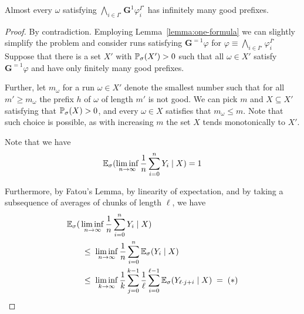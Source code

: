 \documentclass[a4paper,UKenglish]{lipics}
\newcommand{\Gf}[1]{\mathbf{G}^{#1}}
\newcommand{\Ex}[3][]{\ifblank{#1}{\mathbb{E}_{#2}}{\mathbb{E}^{#1}_{#2}}(#3)}
\renewcommand{\Pr}[3][]{\ifblank{#1}{\mathbb{P}_{#2}}{\mathbb{P}^{#1}_{#2}}(#3)}
\newcommand{\fix}[1]{{#1^\star}}
\newcommand{\fixI}{\fix{I}}
\begin{document}
\begin{lemma}\label{lemma:brew-often}
	Almost every $\omega$ satisfying $\bigwedge_{i\in \fixI} \Gf{1} \varphi^\fixI_i$
	has infinitely many good prefixes.
\end{lemma}
\begin{proof}
	By contradiction.
        Employing Lemma~\ref{lemma:one-formula} we can slightly simplify the problem and
        consider runs satisfying  $\Gf{=1}\varphi$ for $\varphi\equiv \bigwedge_{i\in \fixI} \varphi^\fixI_i$
        Suppose that there is a set $X'$ with $\Pr{\sigma}{X'} > 0$ such that
	all $\omega\in X'$ satisfy $\Gf{=1}\varphi$ and have only finitely
	many good prefixes.
	
	Further, let $m_\omega$ for a run $\omega\in X'$ denote the smallest number such that
	for all $m' \ge m_\omega$ the prefix $h$ of $\omega$ of length $m'$ is not good.
	We can pick $m$ and $X\subseteq X'$ satisfying that $\Pr{\sigma}{X} > 0$,
	and every $\omega\in X$ satisfies that $m_\omega \le m$. 
	Note that such choice is possible, as with increasing $m$ the set $X$ tends monotonically to $X'$.
	
	Note that we have
	\begin{align} \label{eq:freq}
	\Ex{\sigma}{\liminf_{n\to\infty} \frac{1}{n}\sum_{i=0}^n Y_i \mid X } = 1
	\end{align}
	
	Furthermore, by Fatou's Lemma, by linearity of expectation, and by taking a subsequence of averages of chunks of length $\ell$, we have
	\begin{align*}
	\Ex{\sigma}{&\liminf_{n\to\infty} \frac{1}{n}\sum_{i=0}^n Y_i\mid X} \\
	& \; \leq \;
	\liminf_{n\rightarrow \infty} \frac{1}{n} \sum_{i=0}^n
	\Ex{\sigma}{Y_i\mid X} \\
	& \; \leq \;
	\liminf_{k\rightarrow \infty} \frac{1}{k} \sum_{j=0}^{k-1} \frac{1}{\ell} \sum_{i=0}^{\ell-1}
	\Ex{\sigma}{Y_{\ell\cdot j + i} \mid X}
	\; = \; (\ast)
	\end{align*}
	

\end{proof}
\end{document}
